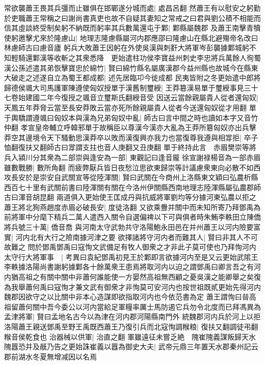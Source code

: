 常欲襲蕭王畏其兵彊而止雖俱在邯鄲遂分城而處|{
	處昌呂翻}
然蕭王有以慰安之躬勤於吏職蕭王常稱之曰謝尚書真吏也故不自疑其妻知之常戒之曰君與劉公積不相能而信其虛談終受制矣躬不納既而躬率其兵數萬還屯于鄴|{
	鄴縣屬魏郡}
及蕭王南擊青犢使躬邀擊尤來於隆慮山|{
	地理志隆慮縣屬河内郡應邵曰隆慮山在縣北避殤帝名改曰林慮師古曰慮音廬}
躬兵大敗蕭王因躬在外使吳漢與刺姧大將軍岑彭襲據鄴城躬不知輕騎還鄴漢等收斬之其衆悉降　更始遣柱功侯李寶益州刺史李忠將兵萬餘人徇蜀漢公孫述遣其弟恢擊寶忠於綿竹|{
	賢曰綿竹縣名屬廣漢郡今益州縣也故城今在縣東}
大破走之述遂自立為蜀王都成都|{
	述先居臨卭今徙成都}
民夷皆附之冬更始遣中郎將歸德侯颯大司馬護軍陳遵使匈奴授單于漢舊制璽綬|{
	王莽簒漢易單于璽綬事見三十七卷始建國二年今復授之颯音立璽斯氏翻綬音受}
因送云當餘親屬貴人從者還匈奴|{
	天鳳五年莽脅云當至長安莽敗云當亦死所餘親屬貴人從者今送還匈奴從才用翻}
單于輿驕謂遵颯曰匈奴本與漢為兄弟匈奴中亂|{
	師古曰言中間之時也讀如本字又音竹仲翻}
孝宣皇帝輔立呼韓邪單于故稱臣以尊漢今漢亦大亂為王莽所簒匈奴亦出兵擊莽空其邊境令天下騷動思漢莽卒以敗而漢復興亦我力也當復尊我遵與相牚拒|{
	卒子恤翻復扶又翻師古曰牚謂支拄也音人庚翻又丑庚翻}
單于終持此言　赤眉樊崇等將兵入潁川分其衆為二部崇與逢安為一部|{
	東觀記曰逢音龎}
徐宣謝禄楊音為一部赤眉雖數戰勝|{
	數所角翻}
而疲弊厭兵皆日夜愁泣思欲東歸崇等計議慮衆東向必散不如西攻長安於是崇安自武關宣等從陸渾關|{
	賢曰武關在今商州上洛縣東文穎曰弘農析縣西百七十里有武關前書曰陸渾關有關在今洛州伊關縣西南地理志陸渾縣屬弘農郡師古曰渾音胡昆翻}
兩道俱入更始使王匡成丹與抗威將軍劉均等分據河東弘農以拒之　蕭王將北狥燕趙度赤眉必破長安|{
	度徒洛翻}
又欲乘釁并關中而未知所寄乃拜鄧禹為前將軍中分麾下精兵二萬人遣西入關令自選偏禆以下可與俱者時朱鮪李軼田立陳僑將兵號三十萬|{
	僑音喬}
與河南太守武勃共守洛陽鮑永田邑在并州蕭王以河内險要富實|{
	河内北有大行之險南據河津之要}
欲擇諸將守河内者而難其人|{
	賢曰非其人不可故難之}
問於鄧禹鄧禹曰寇恂文武備足有牧人御衆之才非此子莫可使也乃拜恂河内太守行大將軍事　|{
	考異曰袁紀鄧禹初見王於鄴即言欲據河内至是又云更始武隂王李軼據洛陽尚書謝躬據鄴各十餘萬衆王患焉將取河内以迫之謂鄧禹曰卿言吾之有河内猶高祖之有關中關中非蕭何誰能使一方晏然高祖無西顧之憂吳漢之能卿舉之矣復為我舉蕭何禹曰寇恂才兼文武有御衆才非恂莫可安河内也按世祖既貳更始先得河内魏郡因欲守之以比關中非本心造謀即欲指取河内也今依范書為定}
蕭王謂恂曰㫺高祖留蕭何關中吾今委公以河内當給足軍糧率厲士馬防遏它兵勿令北度而已拜馮異為孟津將軍|{
	賢曰孟地名古今以為津在河内郡河陽縣南門外}
統魏郡河内兵於河上以拒洛陽蕭王親送鄧禹至野王禹既西蕭王乃復引兵而北寇恂調糇粮|{
	復扶又翻調徒弔翻糇音侯乾食也}
治器械以供軍|{
	治直之翻}
軍雖遠征未嘗乏絶　隗崔隗義謀叛歸天水隗囂恐并及旤乃告之更始誅崔義以囂為御史大夫|{
	武帝元鼎三年置天水郡秦州記云郡前湖水冬夏無增减因以名焉}
